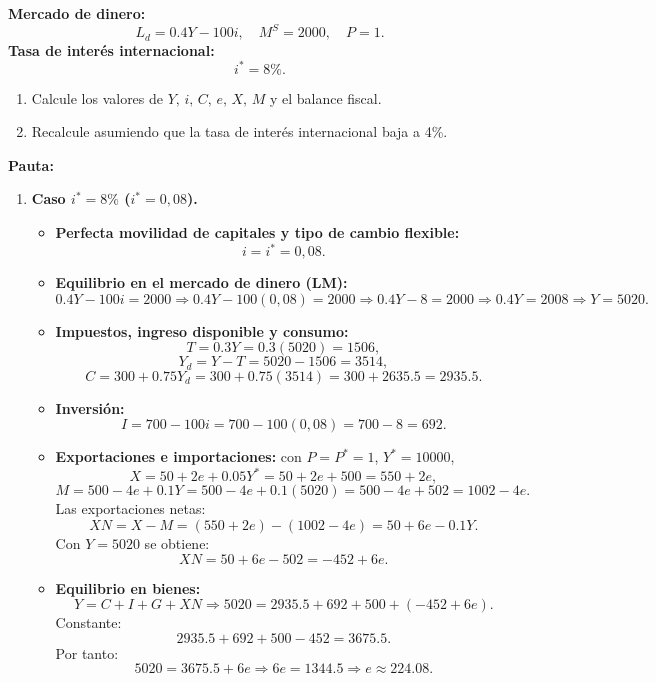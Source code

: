 \documentclass[11pt,addpoints]{article}
\begin{document}
\begin{enumerate}
\begin{itemize}
\textbf{Mercado de dinero:}
\[
L_d = 0.4Y - 100i, \quad M^S = 2000, \quad P = 1.
\]
\textbf{Tasa de interés internacional:} 
\[
i^* = 8\%.
\]

\begin{enumerate}[label=\alph*)]
\item Calcule los valores de \(Y,\, i,\, C,\, e,\, X,\, M\) y el balance fiscal. 
\item Recalcule asumiendo que la tasa de interés internacional baja a 4\%.
\end{enumerate}

\textbf{Pauta:}

\begin{enumerate}[label=\alph*)]
\item \textbf{Caso $i^* = 8\%$ ($i^* = 0{,}08$).}


\newpage
\vspace*{0.1cm}
\begin{itemize}
\item \textbf{Perfecta movilidad de capitales y tipo de cambio flexible:}
\[
i = i^* = 0{,}08.
\]

\item \textbf{Equilibrio en el mercado de dinero (LM):}
\[
0.4Y - 100i = 2000
\Rightarrow 0.4Y - 100(0{,}08) = 2000
\Rightarrow 0.4Y - 8 = 2000
\Rightarrow 0.4Y = 2008 \Rightarrow Y = 5020.
\]

\item \textbf{Impuestos, ingreso disponible y consumo:}
\[
T = 0.3Y = 0.3(5020) = 1506,
\]
\[
Y_d = Y - T = 5020 - 1506 = 3514,
\]
\[
C = 300 + 0.75Y_d = 300 + 0.75(3514) = 300 + 2635.5 = 2935.5.
\]

\item \textbf{Inversión:}
\[
I = 700 - 100i = 700 - 100(0{,}08) = 700 - 8 = 692.
\]

\item \textbf{Exportaciones e importaciones:} con $P=P^*=1$, $Y^*=10000$,
\[
X = 50 + 2e + 0.05Y^* = 50 + 2e + 500 = 550 + 2e,
\]
\[
M = 500 - 4e + 0.1Y = 500 - 4e + 0.1(5020) = 500 - 4e + 502 = 1002 - 4e.
\]
Las exportaciones netas:
\[
XN = X - M = (550 + 2e) - (1002 - 4e) = 50 + 6e - 0.1Y.
\]
Con $Y=5020$ se obtiene:
\[
XN = 50 + 6e - 502 = -452 + 6e.
\]

\item \textbf{Equilibrio en bienes:}
\[
Y = C + I + G + XN
\Rightarrow 5020 = 2935.5 + 692 + 500 + (-452 + 6e).
\]
Constante:
\[
2935.5 + 692 + 500 - 452 = 3675.5.
\]
Por tanto:
\[
5020 = 3675.5 + 6e
\Rightarrow 6e = 1344.5
\Rightarrow e \approx 224.08.
\]


\end{itemize}
\end{enumerate}
\end{itemize}
\end{enumerate}
\end{document}
